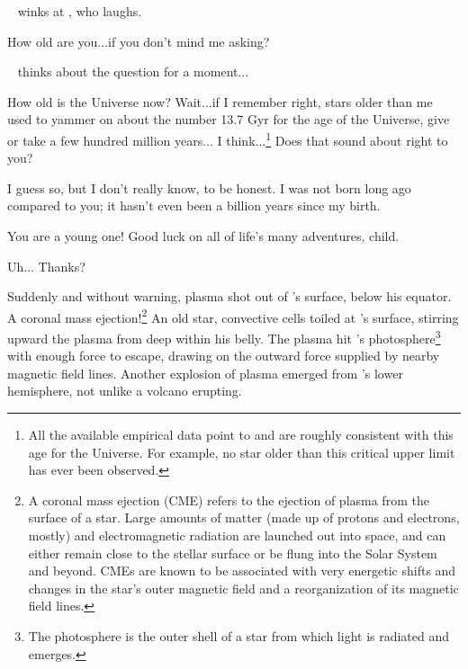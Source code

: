 \documentclass[main.tex]{subfiles}
\begin{document}
\par \nar \rmenrico~ winks at \rmsterope, who laughs.

\par \Sterope How old are you...if you don't mind me asking?

\par \nar \rmenrico~ thinks about the question for a moment...

\par \Enrico How old is the Universe now?  Wait...if I remember right, stars older than me used to yammer on about the number 13.7 Gyr for the age of the Universe, give or take a few hundred million years... I think...\footnote{All the available empirical data point to and are roughly consistent with this age for the Universe.  For example, no star older than this critical upper limit has ever been observed.}  Does that sound about right to you?

\par \Sterope I guess so, but I don't really know, to be honest.  I was not born long ago compared to you; it hasn't even been a billion years since my birth.

\par \Enrico You are a young one!  Good luck on all of life's many adventures, child.  

\par \Sterope Uh... Thanks?

\par \nar Suddenly and without warning, plasma shot out of \rmenrico's surface, below his equator.  A coronal mass ejection!\footnote{A coronal mass ejection (CME) refers to the ejection of plasma from the surface of a star.  Large amounts of matter (made up of protons and electrons, mostly) and electromagnetic radiation are launched out into space, and can either remain close to the stellar surface or be flung into the Solar System and beyond.  CMEs are known to be associated with very energetic shifts and changes in the star's outer magnetic field and a reorganization of its magnetic field lines.}  An old star, convective cells toiled at \rmenrico's surface, stirring upward the plasma from deep within his belly.  The plasma hit \rmenrico's photosphere\footnote{The photosphere is the outer shell of a star from which light is radiated and emerges.} with enough force to escape, drawing on the outward force supplied by nearby magnetic field lines.  Another explosion of plasma emerged from \rmenrico's lower hemisphere, not unlike a volcano erupting.
\end{document}

